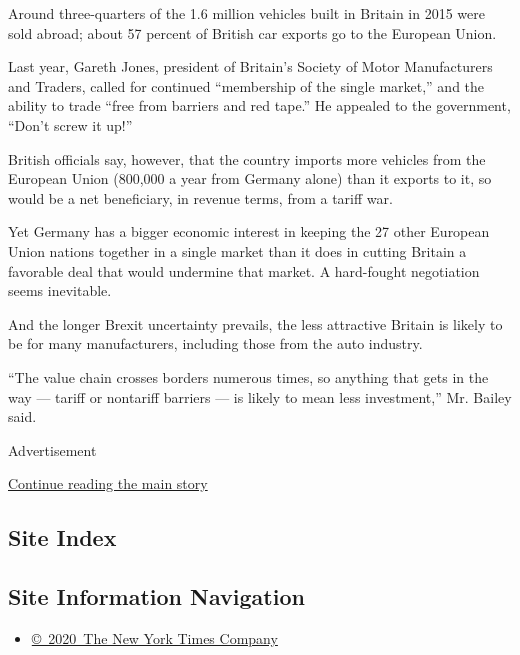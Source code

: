 Around three-quarters of the 1.6 million vehicles built in Britain in
2015 were sold abroad; about 57 percent of British car exports go to the
European Union.

Last year, Gareth Jones, president of Britain's Society of Motor
Manufacturers and Traders, called for continued ``membership of the
single market,'' and the ability to trade ``free from barriers and red
tape.'' He appealed to the government, ``Don't screw it up!''

British officials say, however, that the country imports more vehicles
from the European Union (800,000 a year from Germany alone) than it
exports to it, so would be a net beneficiary, in revenue terms, from a
tariff war.

Yet Germany has a bigger economic interest in keeping the 27 other
European Union nations together in a single market than it does in
cutting Britain a favorable deal that would undermine that market. A
hard-fought negotiation seems inevitable.

And the longer Brexit uncertainty prevails, the less attractive Britain
is likely to be for many manufacturers, including those from the auto
industry.

``The value chain crosses borders numerous times, so anything that gets
in the way --- tariff or nontariff barriers --- is likely to mean less
investment,'' Mr. Bailey said.

Advertisement

\protect\hyperlink{after-bottom}{Continue reading the main story}

\hypertarget{site-index}{%
\subsection{Site Index}\label{site-index}}

\hypertarget{site-information-navigation}{%
\subsection{Site Information
Navigation}\label{site-information-navigation}}

\begin{itemize}
\tightlist
\item
  \href{https://help.nytimes.com/hc/en-us/articles/115014792127-Copyright-notice}{©~2020~The
  New York Times Company}
\end{itemize}

